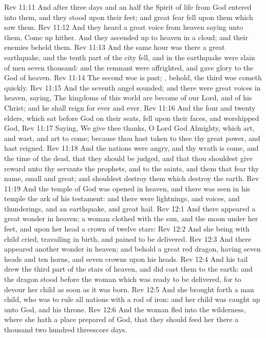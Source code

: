 \vs Rev 11:11 And after three days and an half the Spirit of life from God entered into them, and they stood upon their feet; and great fear fell upon them which saw them.
\vs Rev 11:12 And they heard a great voice from heaven saying unto them, Come up hither. And they ascended up to heaven in a cloud; and their enemies beheld them.
\vs Rev 11:13 And the same hour was there a great earthquake, and the tenth part of the city fell, and in the earthquake were slain of men seven thousand: and the remnant were affrighted, and gave glory to the God of heaven.
\vs Rev 11:14 The second woe is past; , behold, the third woe cometh quickly.
\vs Rev 11:15 And the seventh angel sounded; and there were great voices in heaven, saying, The kingdoms of this world are become  of our Lord, and of his Christ; and he shall reign for ever and ever.
\vs Rev 11:16 And the four and twenty elders, which sat before God on their seats, fell upon their faces, and worshipped God,
\vs Rev 11:17 Saying, We give thee thanks, O Lord God Almighty, which art, and wast, and art to come; because thou hast taken to thee thy great power, and hast reigned.
\vs Rev 11:18 And the nations were angry, and thy wrath is come, and the time of the dead, that they should be judged, and that thou shouldest give reward unto thy servants the prophets, and to the saints, and them that fear thy name, small and great; and shouldest destroy them which destroy the earth.
\vs Rev 11:19 And the temple of God was opened in heaven, and there was seen in his temple the ark of his testament: and there were lightnings, and voices, and thunderings, and an earthquake, and great hail.
\vs Rev 12:1 And there appeared a great wonder in heaven; a woman clothed with the sun, and the moon under her feet, and upon her head a crown of twelve stars:
\vs Rev 12:2 And she being with child cried, travailing in birth, and pained to be delivered.
\vs Rev 12:3 And there appeared another wonder in heaven; and behold a great red dragon, having seven heads and ten horns, and seven crowns upon his heads.
\vs Rev 12:4 And his tail drew the third part of the stars of heaven, and did cast them to the earth: and the dragon stood before the woman which was ready to be delivered, for to devour her child as soon as it was born.
\vs Rev 12:5 And she brought forth a man child, who was to rule all nations with a rod of iron: and her child was caught up unto God, and  his throne.
\vs Rev 12:6 And the woman fled into the wilderness, where she hath a place prepared of God, that they should feed her there a thousand two hundred  threescore days.
